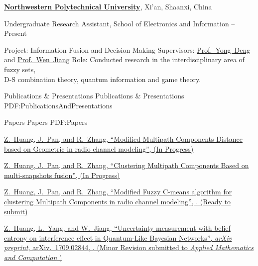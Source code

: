 \documentclass[letterpaper,MMMyyyy,nonstopmode]{simpleresumecv}
\begin{document}
\begin{Body}
\begin{Detail}
\end{Detail}

\Entry
\href{http://en.nwpu.edu.cn/}
{\textbf{Northwestern Polytechnical University}},
Xi'an, Shaanxi, China

\Gap
\BulletItem
Undergraduate Research Assistant, School of Electronics and Information
\hfill
{} --
Present
\begin{Detail}
\SubBulletItem
Project:
Information Fusion and Decision Making
\SubBulletItem
Supervisors:
\href{http://computer.swu.edu.cn/s/computer/szdw2js/20160427/913967.html}
{Prof.~Yong~Deng} and
\href{http://teacher.nwpu.edu.cn/jiangwen.html}
{Prof.~Wen~Jiang}
\SubBulletItem
Role:
Conducted research in the interdisciplinary area of fuzzy sets,\\ D-S combination theory, quantum information and game theory.
\end{Detail}

\Section
{Publications \&\newline
Presentations}
{Publications \& Presentations}
{PDF:PublicationsAndPresentations}

\SubSection
{Papers}
{Papers}
{PDF:Papers}

\begingroup
\renewcommand{\MaxNumberedItem}{[88]}

\Gap
\NumberedItem{[1]}
\href{https://arxiv.org/abs/1709.02844}
{\underline{Z.~Huang}, J.~Pan, and R.~Zhang,
``Modified Multipath Components Distance based on Geometric in radio channel modeling'',
(In Progress)}

\Gap
\NumberedItem{[2]}
\href{https://arxiv.org/abs/1709.02844}
{\underline{Z.~Huang}, J.~Pan, and R.~Zhang,
``Clustering Multipath Components Based on multi-snapshots fusion'',
(In Progress)}

\Gap
\NumberedItem{[3]}
\href{https://arxiv.org/abs/1709.02844}
{\underline{Z.~Huang}, J.~Pan, and R.~Zhang,
``Modified Fuzzy C-means algorithm for clustering Multipath Components in radio channel modeling'',
. (Ready to submit)}

\Gap
\NumberedItem{[4]}
\href{https://arxiv.org/abs/1709.02844}
{\underline{Z.~Huang}, L.~Yang, and W.~Jiang,
``Uncertainty measurement with belief entropy on interference effect in Quantum-Like Bayesian Networks'',
\textit{arXiv preprint},
arXiv.~1709.02844,
. (Minor Revision submitted to \textit{Applied Mathematics and Computation} )}


\end{Body}
\end{document}
